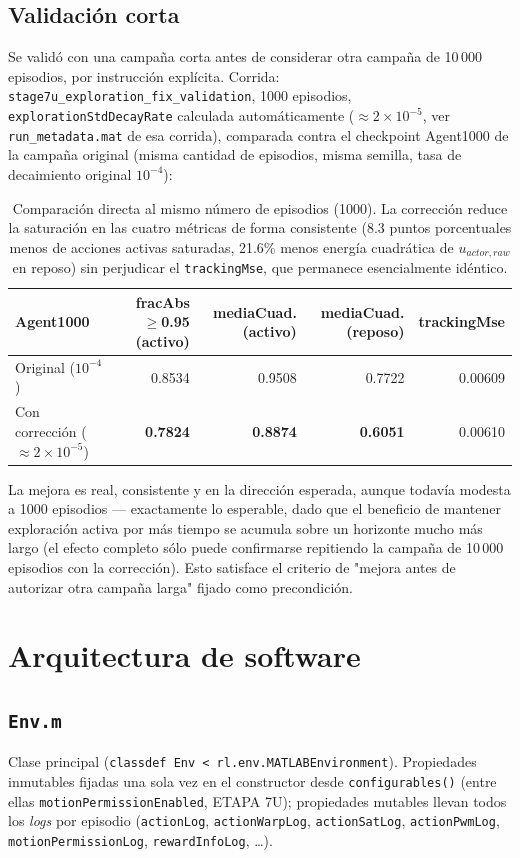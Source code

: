 \documentclass[11pt,a4paper]{article}
\begin{document}
\subsection{Validación corta}

Se validó con una campaña corta antes de considerar otra campaña de 10\,000 episodios,
por instrucción explícita. Corrida:
\texttt{stage7u\_exploration\_fix\_validation}, 1000 episodios,
\texttt{explorationStdDecayRate} calculada automáticamente
($\approx2\times10^{-5}$, ver \texttt{run\_metadata.mat} de esa corrida), comparada
contra el checkpoint Agent1000 de la campaña original (misma cantidad de episodios,
misma semilla, tasa de decaimiento original $10^{-4}$):

\begin{table}[H]
\centering\small
\begin{tabular}{lrrrr}
\toprule
Agent1000 & fracAbs$\geq$0.95 (activo) & mediaCuad. (activo) & mediaCuad. (reposo) & trackingMse \\
\midrule
Original ($10^{-4}$) & 0.8534 & 0.9508 & 0.7722 & 0.00609 \\
Con corrección ($\approx2\times10^{-5}$) & \textbf{0.7824} & \textbf{0.8874} & \textbf{0.6051} & 0.00610 \\
\bottomrule
\end{tabular}
\caption{Comparación directa al mismo número de episodios (1000). La corrección
reduce la saturación en las cuatro métricas de forma consistente (8.3 puntos
porcentuales menos de acciones activas saturadas, 21.6\% menos energía cuadrática de
$u_{actor,raw}$ en reposo) sin perjudicar el \texttt{trackingMse}, que permanece
esencialmente idéntico.}
\label{tab:validacion-corta}
\end{table}

La mejora es real, consistente y en la dirección esperada, aunque todavía modesta a
1000 episodios --- exactamente lo esperable, dado que el beneficio de mantener
exploración activa por más tiempo se acumula sobre un horizonte mucho más largo
(el efecto completo sólo puede confirmarse repitiendo la campaña de 10\,000 episodios
con la corrección). Esto satisface el criterio de "mejora antes de autorizar otra
campaña larga" fijado como precondición.

\section{Arquitectura de software}

\subsection{\texttt{Env.m}}
Clase principal (\texttt{classdef Env < rl.env.MATLABEnvironment}). Propiedades
inmutables fijadas una sola vez en el constructor desde \texttt{configurables()}
(entre ellas \texttt{motionPermissionEnabled}, ETAPA 7U); propiedades mutables llevan
todos los \emph{logs} por episodio (\texttt{actionLog}, \texttt{actionWarpLog},
\texttt{actionSatLog}, \texttt{actionPwmLog}, \texttt{motionPermissionLog},
\texttt{rewardInfoLog}, \ldots).
\end{document}
